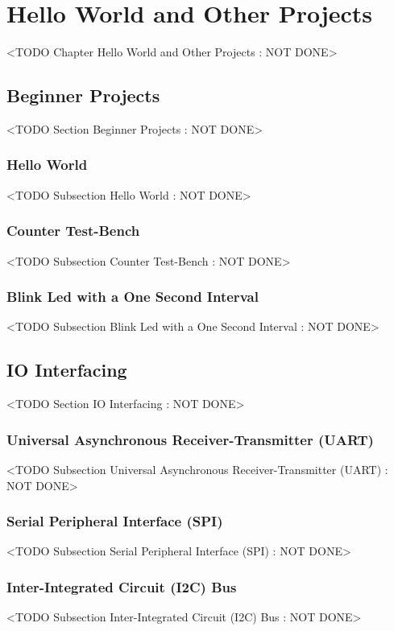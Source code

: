 \chapter{Hello World and Other Projects}
	<TODO Chapter Hello World and Other Projects : NOT DONE>

\section{Beginner Projects}
	<TODO Section Beginner Projects : NOT DONE>

\subsection{Hello World}
	<TODO Subsection Hello World : NOT DONE>

\subsection{Counter Test-Bench}
	<TODO Subsection Counter Test-Bench : NOT DONE>

\subsection{Blink Led with a One Second Interval}
	<TODO Subsection Blink Led with a One Second Interval : NOT DONE>

\section{IO Interfacing}
	<TODO Section IO Interfacing : NOT DONE>

\subsection{Universal Asynchronous Receiver-Transmitter (UART)}
	<TODO Subsection Universal Asynchronous Receiver-Transmitter (UART) : NOT DONE>

\subsection{Serial Peripheral Interface (SPI)}
	<TODO Subsection Serial Peripheral Interface (SPI) : NOT DONE>

\subsection{Inter-Integrated Circuit (I2C) Bus}
	<TODO Subsection Inter-Integrated Circuit (I2C) Bus : NOT DONE>

